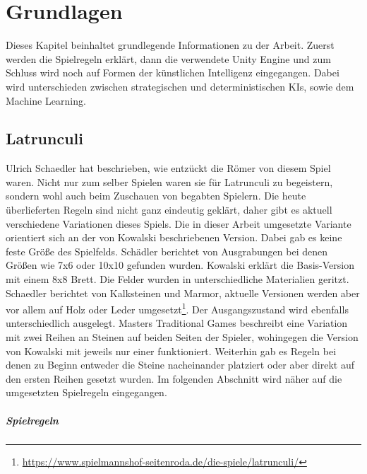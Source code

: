 
\chapter{Grundlagen}
\label{ch:Grundlagen}
Dieses Kapitel beinhaltet grundlegende Informationen zu der Arbeit. Zuerst werden die Spielregeln erklärt, dann die verwendete Unity Engine und zum Schluss wird noch auf Formen der künstlichen Intelligenz eingegangen. Dabei wird unterschieden zwischen strategischen und deterministischen KIs, sowie dem Machine Learning.
\section{Latrunculi}
\label{ch:Grundlagen:sec:Latrunculi}
Ulrich Schaedler\cite{homoLudens} hat beschrieben, wie entzückt die Römer von diesem Spiel waren. Nicht nur zum selber Spielen waren sie für Latrunculi zu begeistern, sondern wohl auch beim Zuschauen von begabten Spielern. Die heute überlieferten Regeln sind nicht ganz eindeutig geklärt, daher gibt es aktuell verschiedene Variationen dieses Spiels. Die in dieser Arbeit umgesetzte Variante orientiert sich an der von Kowalski\cite{comscigate} beschriebenen Version. Dabei gab es keine feste Größe des Spielfelds. Schädler\cite{homoLudens} berichtet von Ausgrabungen bei denen Größen wie 7x6 oder 10x10 gefunden wurden. Kowalski\cite{comscigate} erklärt die Basis-Version mit einem 8x8 Brett. Die Felder wurden in unterschiedliche Materialien geritzt. Schaedler berichtet von Kalksteinen und Marmor, aktuelle Versionen werden aber vor allem auf Holz oder Leder umgesetzt\footnote[4]{\url{https://www.spielmannshof-seitenroda.de/die-spiele/latrunculi/}}. Der Ausgangszustand wird ebenfalls unterschiedlich ausgelegt. Masters Traditional Games\cite{mastersgames} beschreibt eine Variation mit zwei Reihen an Steinen auf beiden Seiten der Spieler, wohingegen die Version von Kowalski\cite{comscigate} mit jeweils nur einer funktioniert. Weiterhin gab es Regeln bei denen zu Beginn entweder die Steine nacheinander platziert\cite{homoLudens} oder aber direkt auf den ersten Reihen gesetzt wurden. Im folgenden Abschnitt wird näher auf die umgesetzten Spielregeln eingegangen.
\paragraph{Spielregeln}
\label{ch:Grundlagen:sec:Spielregeln}

